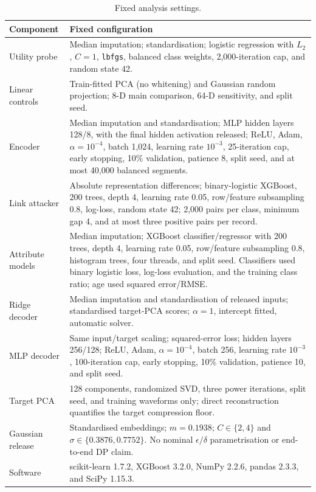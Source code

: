\documentclass[journal]{IEEEtran}
\begin{document}
\begin{table}[ht]
\centering
\scriptsize
\caption{Fixed analysis settings.}
\label{tab:fixed-settings}
\begin{tabular}{@{}p{}p{}@{}}
\toprule
Component & Fixed configuration \\
\midrule
Utility probe & Median imputation; standardisation; logistic regression with
$L_2$, $C=1$, \texttt{lbfgs}, balanced class weights, 2,000-iteration cap,
and random state 42. \\
Linear controls & Train-fitted PCA (no whitening) and Gaussian random
projection; 8-D main comparison, 64-D sensitivity, and split seed. \\
Encoder & Median imputation and standardisation; MLP hidden layers 128/8,
with the final hidden activation released; ReLU, Adam, $\alpha=10^{-4}$,
batch 1,024, learning rate $10^{-3}$, 25-iteration cap, early stopping,
10\% validation, patience 8, split seed, and at most 40,000 balanced segments. \\
Link attacker & Absolute representation differences; binary-logistic XGBoost,
200 trees, depth 4, learning rate 0.05, row/feature subsampling 0.8, log-loss,
random state 42; 2,000 pairs per class, minimum gap 4, and at most three
positive pairs per record. \\
Attribute models & Median imputation; XGBoost classifier/regressor with 200
trees, depth 4, learning rate 0.05, row/feature subsampling 0.8, histogram
trees, four threads, and split seed. Classifiers used binary logistic loss,
log-loss evaluation, and the training class ratio; age used squared error/RMSE. \\
Ridge decoder & Median imputation and standardisation of released inputs;
standardised target-PCA scores; $\alpha=1$, intercept fitted, automatic solver. \\
MLP decoder & Same input/target scaling; squared-error loss; hidden layers
256/128; ReLU, Adam, $\alpha=10^{-4}$, batch 256, learning rate $10^{-3}$,
100-iteration cap, early stopping, 10\% validation, patience 10, and split seed. \\
Target PCA & 128 components, randomized SVD, three power iterations, split
seed, and training waveforms only; direct reconstruction quantifies the target
compression floor. \\
Gaussian release & Standardised embeddings; $m=0.1938$;
$C\in\{2,4\}$ and $\sigma\in\{0.3876,0.7752\}$. No nominal
$\epsilon/\delta$ parametrisation or end-to-end DP claim. \\
Software & scikit-learn 1.7.2, XGBoost 3.2.0, NumPy 2.2.6, pandas 2.3.3,
and SciPy 1.15.3. \\
\bottomrule
\end{tabular}
\end{table}
\end{document}
